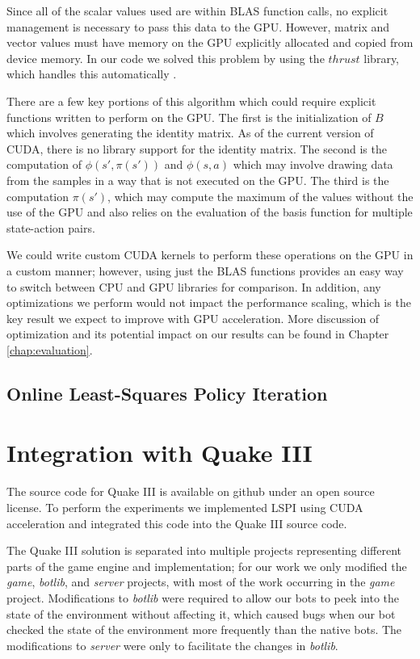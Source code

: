 Since all of the scalar values used are within BLAS function calls, no explicit management is necessary to pass this data to the GPU. However, matrix and vector values must have memory on the GPU explicitly allocated and copied from device memory. In our code we solved this problem by using the $thrust$ library, which handles this automatically \cite{thrust}.

There are a few key portions of this algorithm which could require explicit functions written to perform on the GPU. The first is the initialization of $B$ which involves generating the identity matrix. As of the current version of CUDA, there is no library support for the identity matrix. The second is the computation of $\phi(s',\pi(s'))$ and $\phi(s,a)$ which may involve drawing data from the samples in a way that is not executed on the GPU. The third is the computation $\pi(s')$, which may compute the maximum of the values without the use of the GPU and also relies on the evaluation of the basis function for multiple state-action pairs.

We could write custom CUDA kernels to perform these operations on the GPU in a custom manner; however, using just the BLAS functions provides an easy way to switch between CPU and GPU libraries for comparison. In addition, any optimizations we perform would not impact the performance scaling, which is the key result we expect to improve with GPU acceleration. More discussion of optimization and its potential impact on our results can be found in Chapter \ref{chap:evaluation}.

\subsection{Online Least-Squares Policy Iteration}

\section{Integration with Quake III}

The source code for Quake III is available on github under an open source license. \cite{q3code} To perform the experiments we implemented LSPI using CUDA acceleration and integrated this code into the Quake III source code.

The Quake III solution is separated into multiple projects representing different parts of the game engine and implementation; for our work we only modified the \emph{game}, \emph{botlib}, and \emph{server} projects, with most of the work occurring in the \emph{game} project. Modifications to \emph{botlib} were required to allow our bots to peek into the state of the environment without affecting it, which caused bugs when our bot checked the state of the environment more frequently than the native bots. The modifications to \emph{server} were only to facilitate the changes in \emph{botlib}.

